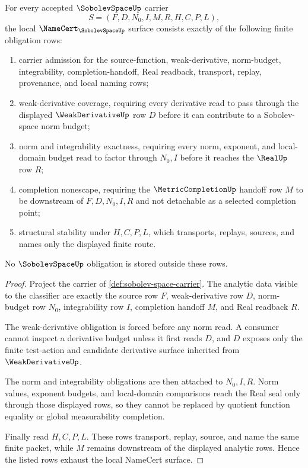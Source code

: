 \begin{theorem}
\label{thm:sobolev-space-namecert-obligations}
For every accepted $\SobolevSpaceUp$ carrier
$$
S=(F,D,N_0,I,M,R,H,C,P,L),
$$
the local $\NameCert_{\SobolevSpaceUp}$ surface consists exactly of the following finite obligation rows:
\begin{enumerate}
\item carrier admission for the source-function, weak-derivative, norm-budget, integrability, completion-handoff, Real readback, transport, replay, provenance, and local naming rows;
\item weak-derivative coverage, requiring every derivative read to pass through the displayed $\WeakDerivativeUp$ row $D$ before it can contribute to a Sobolev-space norm budget;
\item norm and integrability exactness, requiring every norm, exponent, and local-domain budget read to factor through $N_0,I$ before it reaches the $\RealUp$ row $R$;
\item completion nonescape, requiring the $\MetricCompletionUp$ handoff row $M$ to be downstream of $F,D,N_0,I,R$ and not detachable as a selected completion point;
\item structural stability under $H,C,P,L$, which transports, replays, sources, and names only the displayed finite route.
\end{enumerate}
No $\SobolevSpaceUp$ obligation is stored outside these rows.
\end{theorem}
\begin{proof}
Project the carrier of \autoref{def:sobolev-space-carrier}. The analytic data visible to the classifier are exactly the source row $F$, weak-derivative row $D$, norm-budget row $N_0$, integrability row $I$, completion handoff $M$, and Real readback $R$.

The weak-derivative obligation is forced before any norm read. A consumer cannot inspect a derivative budget unless it first reads $D$, and $D$ exposes only the finite test-action and candidate derivative surface inherited from $\WeakDerivativeUp$.

The norm and integrability obligations are then attached to $N_0,I,R$. Norm values, exponent budgets, and local-domain comparisons reach the Real seal only through those displayed rows, so they cannot be replaced by quotient function equality or global measurability completion.

Finally read $H,C,P,L$. These rows transport, replay, source, and name the same finite packet, while $M$ remains downstream of the displayed analytic rows. Hence the listed rows exhaust the local NameCert surface.
\end{proof}

